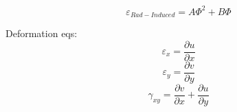 \documentclass[11pt,letterpaper]{article}
\begin{document}
\begin{equation}
\varepsilon_{Rad-Induced} = A \Phi^2 + B \Phi
\end{equation}

Deformation eqs:
\begin{equation}
\varepsilon_x = \frac{\partial u}{\partial x}
\end{equation}
\begin{equation}
\varepsilon_y = \frac{\partial v}{\partial y}
\end{equation}
\begin{equation}
\gamma_{xy} = \frac{\partial v}{\partial x} + \frac{\partial u}{\partial y}
\end{equation}

\pagebreak 


\end{document}
